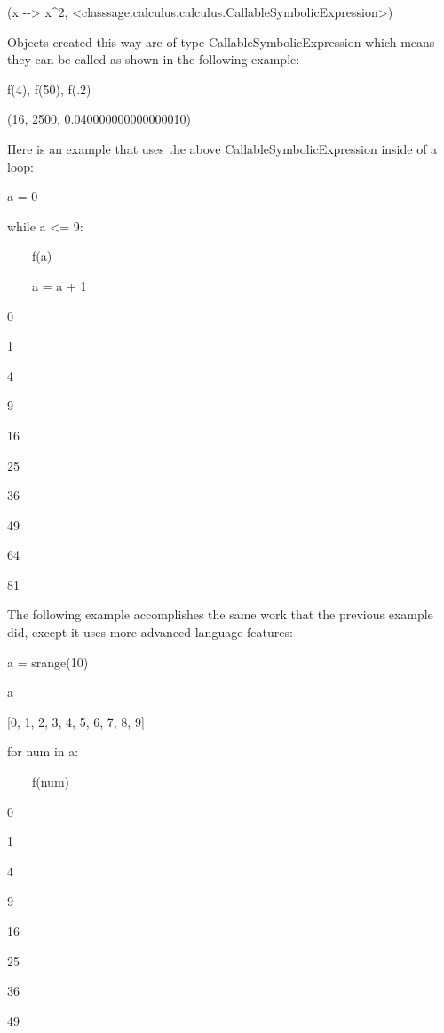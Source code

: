 \documentclass[12pt,twoside]{book}
\begin{document}
{\textbar}

(x {\textbar}{}-{}-{\textgreater} x\^{}2,
{\textless}class{\textquotesingle}sage.calculus.calculus.CallableSymbolicExpression{\textquotesingle}{\textgreater})

Objects created this way are of type CallableSymbolicExpression which
means they can be called as shown in the following example:


\bigskip

f(4), f(50), f(.2)

{\textbar}

(16, 2500, 0.040000000000000010)

Here is an example that uses the above CallableSymbolicExpression inside
of a loop:


\bigskip

a = 0

while a {\textless}= 9:

\ \ \ \ f(a)

\ \ \ \ a = a + 1

{\textbar}

0

1

4

9

16

25

36

49

64

81


\bigskip

The following example accomplishes the same work that the previous
example did, except it uses more advanced language features:


\bigskip

a = srange(10)

a

{\textbar}

[0, 1, 2, 3, 4, 5, 6, 7, 8, 9]


\bigskip

for num in a:

\ \ \ \ f(num)

{\textbar}

0

1

4

9

16

25

36

49
\end{document}

